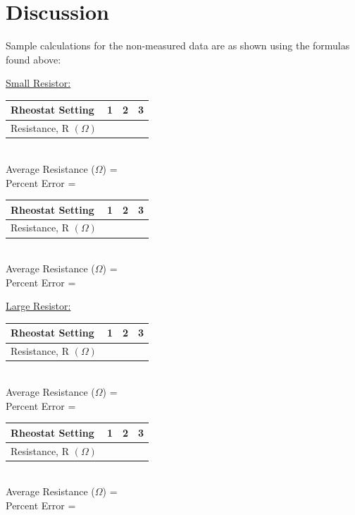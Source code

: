 \documentclass[11pt, titlepage]{article}
\begin{document}
\section*{Discussion}
Sample calculations for the non-measured data are as shown using the formulas found above:

\underline{Small Resistor:}
\begin{center}
\begin{tabular}
{|m{9em}|m{7em}|m{7em}|m{7em}|}
\hline
Rheostat Setting & 1 & 2 & 3 \\
\hline
Resistance, R $(\Omega)$ & & & \\
\hline
\end{tabular}
\\Average Resistance ($\Omega$) =
\\Percent Error = 
\end{center}

\begin{center}
\begin{tabular}
{|m{9em}|m{7em}|m{7em}|m{7em}|}
\hline
Rheostat Setting & 1 & 2 & 3 \\
\hline
Resistance, R $(\Omega)$ & & & \\
\hline
\end{tabular}
\\Average Resistance ($\Omega$) = 
\\Percent Error = 
\end{center}

\underline{Large Resistor:}
\begin{center}
\begin{tabular}
{|m{9em}|m{7em}|m{7em}|m{7em}|}
\hline
Rheostat Setting & 1 & 2 & 3 \\
\hline
Resistance, R $(\Omega)$ & & & \\
\hline
\end{tabular}
\\Average Resistance ($\Omega$) = 
\\Percent Error = 
\end{center}

\begin{center}
\begin{tabular}
{|m{9em}|m{7em}|m{7em}|m{7em}|}
\hline
Rheostat Setting & 1 & 2 & 3 \\
\hline
Resistance, R $(\Omega)$ & & & \\
\hline
\end{tabular}
\\Average Resistance ($\Omega$) =
\\Percent Error = 
\end{center}
\end{document}
